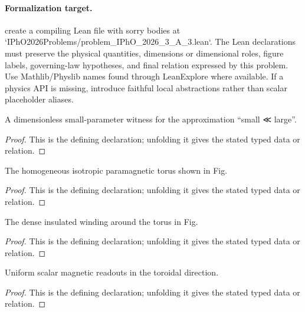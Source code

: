 \paragraph{Formalization target.}
create a compiling Lean file with sorry bodies at `IPhO2026Problems/problem\_IPhO\_2026\_3\_A\_3.lean`. The Lean declarations must preserve the physical quantities, dimensions or dimensional roles, figure labels, governing-law hypotheses, and final relation expressed by this problem.
Use Mathlib/Physlib names found through LeanExplore where available. If a physics API is missing, introduce faithful local abstractions rather than scalar placeholder aliases.

\begin{definition}[ScaleSeparation]
  \label{decl:physics:IPhO_2026_3_A_3:ScaleSeparation}
  A dimensionless small-parameter witness for the approximation “small ≪ large”.
\end{definition}
\begin{proof}
  This is the defining declaration; unfolding it gives the stated typed data or relation.
\end{proof}

\begin{definition}[ParamagneticToroid]
  \label{decl:physics:IPhO_2026_3_A_3:ParamagneticToroid}
  The homogeneous isotropic paramagnetic torus shown in Fig.
\end{definition}
\begin{proof}
  This is the defining declaration; unfolding it gives the stated typed data or relation.
\end{proof}

\begin{definition}[DenseInsulatedWinding]
  \label{decl:physics:IPhO_2026_3_A_3:DenseInsulatedWinding}
  The dense insulated winding around the torus in Fig.
\end{definition}
\begin{proof}
  This is the defining declaration; unfolding it gives the stated typed data or relation.
\end{proof}

\begin{definition}[UniformMagneticState]
  \label{decl:physics:IPhO_2026_3_A_3:UniformMagneticState}
  Uniform scalar magnetic readouts in the toroidal direction.
\end{definition}
\begin{proof}
  This is the defining declaration; unfolding it gives the stated typed data or relation.
\end{proof}

